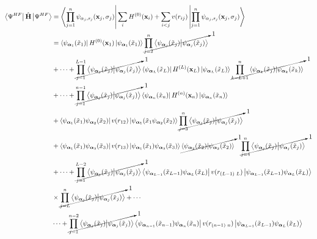\documentclass{homework}
\begin{document}
\begin{align*}
    \bra{\Psi^{HF}}\hat{\bf H}\ket{\Psi^{HF}} &= \bra{ \prod_{j =1}^{n}\psi_{\alpha_j, s_j}({\bf x}_j, \sigma_j)} \sum_i H^{(0)}({\bf x}_i) + \sum_{i<j} v(r_{ij}) \ket{\prod_{j=1}^{n}\psi_{\alpha_j, s_j}({\bf x}_j, \sigma_j) } \\
    &= \bra{\psi_{\bm{\alpha}_{1}}(\tilde{x}_1)} {H}^{(0)}({\bf x}_1) \ket{\psi_{\bm{\alpha}_{1}}(\tilde{x}_1)} \cancelto{1}{\prod_{j=2}^{n} \bra{\psi_{\bm{\alpha}_{j}} (\tilde{x}_j)}\ket{\psi_{\bm{\alpha}_{j}}(\tilde{x}_j)}} \\
    & + \cdots + \cancelto{1}{\prod_{j=1}^{L-1} \bra{\psi_{\bm{\alpha}_{j}} (\tilde{x}_j)}\ket{\psi_{\bm{\alpha}_{j}}(\tilde{x}_j)} }\bra{\psi_{\bm{\alpha}_{L}}(\tilde{x}_L)} {H}^{(L)}({\bf x}_L) \ket{\psi_{\bm{\alpha}_{L}}(\tilde{x}_L)} \cancelto{1}{\prod_{k = L+1}^{n} \bra{\psi_{\bm{\alpha}_{k}} (\tilde{x}_j)}\ket{\psi_{\bm{\alpha}_{k}}(\tilde{x}_k)}} \\
    & + \cdots + \cancelto{1}{\prod_{j=1}^{n-1} \bra{\psi_{\bm{\alpha}_{j}} (\tilde{x}_j)}\ket{\psi_{\bm{\alpha}_{j}}(\tilde{x}_j)}} \bra{\psi_{\bm{\alpha}_{n}}(\tilde{x}_n)} {H}^{(n)}({\bf x}_n) \ket{\psi_{\bm{\alpha}_{n}}(\tilde{x}_n)} \\
    &+ \bra{\psi_{\bm{\alpha}_{1}}(\tilde{x}_1) \psi_{\bm{\alpha}_{2}}(\tilde{x}_2)} v(r_{12}) \ket{\psi_{\bm{\alpha}_{1}}(\tilde{x}_1 \psi_{\bm{\alpha}_{2}}(\tilde{x}_2)} \cancelto{1}{\prod_{j=3}^{n} \bra{\psi_{\bm{\alpha}_{j}} (\tilde{x}_j)}\ket{\psi_{\bm{\alpha}_{j}}(\tilde{x}_j)}}  \\
    &+ \bra{\psi_{\bm{\alpha}_{1}}(\tilde{x}_1) \psi_{\bm{\alpha}_{3}}(\tilde{x}_3)} v(r_{13}) \ket{\psi_{\bm{\alpha}_{1}}(\tilde{x}_1) \psi_{\bm{\alpha}_{3}}(\tilde{x}_3)} \cancelto{1}{\bra{\psi_{\bm{\alpha}_{2}} (\tilde{x}_2)}\ket{\psi_{\bm{\alpha}_{2}} (\tilde{x}_2)}} \textnormal{ } \textnormal{ } \textnormal{ } \cancelto{1}{\prod_{j=4}^{n} \bra{\psi_{\bm{\alpha}_{j}} (\tilde{x}_j)}\ket{\psi_{\bm{\alpha}_{j}}(\tilde{x}_j)}} \\
    & + \cdots + \cancelto{1}{\prod_{j=1}^{L-2} \bra{\psi_{\bm{\alpha}_{j}} (\tilde{x}_j)}\ket{\psi_{\bm{\alpha}_{j}}(\tilde{x}_j)}} \bra{\psi_{\bm{\alpha}_{L-1}}(\tilde{x}_{L-1})\psi_{\bm{\alpha}_{L}}(\tilde{x}_{L})} v(r_{(L-1) \textnormal{ } L}) \ket{\psi_{\bm{\alpha}_{L-1}}(\tilde{x}_{L-1})\psi_{\bm{\alpha}_{L}}(\tilde{x}_{L})} \\
    & \times \cancelto{1}{\prod_{j=L}^{n} \bra{\psi_{\bm{\alpha}_{j}} (\tilde{x}_j)}\ket{\psi_{\bm{\alpha}_{j}}(\tilde{x}_j)}} + \cdots \\
    & \cdots + \cancelto{1}{\prod_{j=1}^{n-2} \bra{\psi_{\bm{\alpha}_{j}} (\tilde{x}_j)}\ket{\psi_{\bm{\alpha}_{j}}(\tilde{x}_j)}} \bra{\psi_{\bm{\alpha}_{n-1}}(\tilde{x}_{n-1})\psi_{\bm{\alpha}_{n}}(\tilde{x}_{n})} v(r_{(n-1) \textnormal{ } n}) \ket{\psi_{\bm{\alpha}_{L-1}}(\tilde{x}_{L-1})\psi_{\bm{\alpha}_{L}}(\tilde{x}_{L})} \\
\end{align*}
\end{document}
